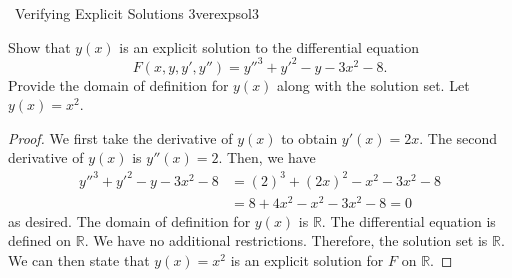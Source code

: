         \begin{example}{\Difficulty\,\Difficulty\,\,Verifying Explicit Solutions 3}{verexpsol3}
        
            Show that \(y(x)\) is an explicit solution to the differential equation
            \begin{equation*}
                F(x,y,y',y'')=y''^3+y'^2-y-3x^2-8.
            \end{equation*}
            Provide the domain of definition for \(y(x)\) along with the solution set. Let \(y(x)=x^2\).
            \begin{proof}
                We first take the derivative of \(y(x)\) to obtain \(y'(x)=2x\). The second derivative of \(y(x)\) is \(y''(x)=2\). Then, we have
                \begin{align*}
                    y''^3+y'^2-y-3x^2-8&=(2)^3+(2x)^2-x^2-3x^2-8 \\
                    &=8+4x^2-x^2-3x^2-8=0
                \end{align*}
                as desired. The domain of definition for \(y(x)\) is \(\mathbb{R}\). The differential equation is defined on \(\mathbb{R}\). We have no additional restrictions. Therefore, the solution set is \(\mathbb{R}\).
                We can then state that \(y(x)=x^2\) is an explicit solution for \(F\) on \(\mathbb{R}\).
            \end{proof}
            
        \end{example}
        \pagebreak
